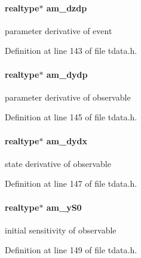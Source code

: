 \hypertarget{struct_temp_data_a1df093f48bf98db04c63e845d7b1d58b}{}
\paragraph[{am\+\_\+dzdp}]{\setlength{\rightskip}{0pt plus 5cm}realtype$\ast$ am\+\_\+dzdp}\label{struct_temp_data_a1df093f48bf98db04c63e845d7b1d58b}
parameter derivative of event 

Definition at line 143 of file tdata.\+h.

\hypertarget{struct_temp_data_a76083cb4a9598daa381dbaa9c17aadc6}{}
\paragraph[{am\+\_\+dydp}]{\setlength{\rightskip}{0pt plus 5cm}realtype$\ast$ am\+\_\+dydp}\label{struct_temp_data_a76083cb4a9598daa381dbaa9c17aadc6}
parameter derivative of observable 

Definition at line 145 of file tdata.\+h.

\hypertarget{struct_temp_data_a062c7ecfd4107b320dfd2fc0e4211a6b}{}
\paragraph[{am\+\_\+dydx}]{\setlength{\rightskip}{0pt plus 5cm}realtype$\ast$ am\+\_\+dydx}\label{struct_temp_data_a062c7ecfd4107b320dfd2fc0e4211a6b}
state derivative of observable 

Definition at line 147 of file tdata.\+h.

\hypertarget{struct_temp_data_a7c1a4e54905d0fea6c4ec952cd7a96d8}{}
\paragraph[{am\+\_\+y\+S0}]{\setlength{\rightskip}{0pt plus 5cm}realtype$\ast$ am\+\_\+y\+S0}\label{struct_temp_data_a7c1a4e54905d0fea6c4ec952cd7a96d8}
initial sensitivity of observable 

Definition at line 149 of file tdata.\+h.

